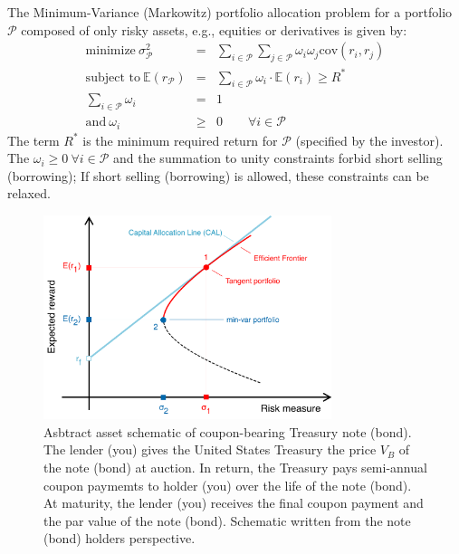 \documentclass[11pt]{article}
\theoremstyle{definition}
\begin{document}
The Minimum-Variance (Markowitz) portfolio allocation problem for a portfolio $\mathcal{P}$ 
composed of only risky assets, e.g., equities or derivatives is given by:
\begin{eqnarray*}
\text{minimize}~\sigma_{\mathcal{P}}^2 &=& \sum_{i\in\mathcal{P}}\sum_{j\in\mathcal{P}}\omega_{i}\omega_{j}
\text{cov}\left(r_{i},r_{j}\right) \\
\text{subject to}~\mathbb{E}(r_{\mathcal{P}})& = & \sum_{i\in\mathcal{P}}\omega_{i}\cdot\mathbb{E}(r_{i})\geq{R^{*}} \\
\sum_{i\in\mathcal{P}}\omega_{i} & = & 1 \\
\text{and}~\omega_{i}&\geq&{0}\qquad{\forall{i}\in\mathcal{P}}
\end{eqnarray*}
The term $R^{*}$ is the minimum required return for $\mathcal{P}$ (specified by the investor). 
The $\omega_{i}\geq{0}~\forall{i}\in\mathcal{P}$ and the summation to unity constraints forbid short selling (borrowing); 
If short selling (borrowing) is allowed, these constraints can be relaxed.

\begin{figure}[h]
    \centering
    \includegraphics[width=0.75\textwidth]{./figs/Fig-MinVar-Risky-and-RiskFree-Allocation.pdf}
    \caption{Asbtract asset schematic of coupon-bearing Treasury note (bond). The lender (you) gives the United States Treasury 
    the price $V_{B}$ of the note (bond) at auction. In return, the Treasury pays semi-annual coupon paymemts to holder (you) 
    over the life of the note (bond). At maturity, the lender (you) receives the final coupon payment
    and the par value of the note (bond). Schematic written from the note (bond) holders perspective.}\label{fig:risky-assets-schematic-minvar}
\end{figure}
\end{document}
